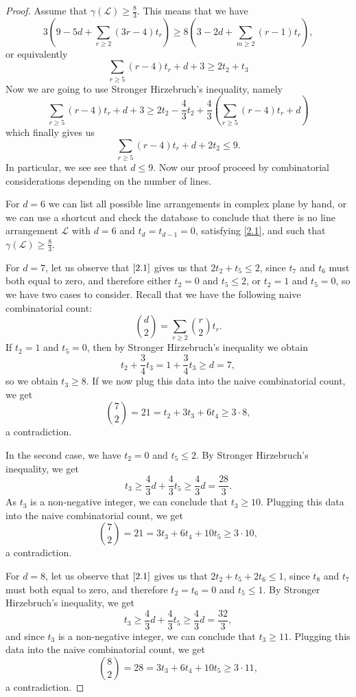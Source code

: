 \documentclass{article}
\theoremstyle{plain}
\theoremstyle{definition}
\numberwithin{equation}{section}
\begin{document}
\begin{proof}
Assume that  $\gamma(\mathcal{L})\geq\frac{8}{3}$. 
This means that we have
\[3(9-5d+\sum_{r\geq 2}(3r-4)t_{r}) \geq 8(3-2d+\sum_{m\geq 2}(r-1)t_{r}),\]
or equivalently
\[\sum_{r\geq 5}(r-4)t_{r} + d + 3\geq 2t_{2}+t_{3}\]
Now we are going to use Stronger Hirzebruch's inequality, namely
\[\sum_{r\geq 5}(r-4)t_{r} + d + 3 \geq 2t_{2} - \frac{4}{3} t_{2} + \dfrac{4}{3}\left(\sum_{r\geq 5}(r-4) t_{r} +d  \right)\]
which finally gives us
\begin{equation}\label{2.1}
\sum_{r\geq 5}(r-4)t_{r} + d + 2t_{2} \leq 9.    
\end{equation}
In particular, we see see that $d\leq 9$. Now our proof proceed by combinatorial considerations depending on the number of lines. 

For $d=6$ we can list all possible line arrangements in complex plane by hand, or we can use a shortcut and check the database \cite{Mat} to conclude that there is no line arrangement $\mathcal{L}$ with $d=6$ and $t_{d}=t_{d-1}=0$, satisfying \eqref{2.1}, and such that $\gamma(\mathcal{L}) \geq \frac{8}{3}$.

For $d=7$, let us observe that $\eqref{2.1}$ gives us that $2t_{2} + t_{5} \leq 2$, since $t_{7}$ and $t_{6}$ must both equal to zero, and therefore either $t_{2}=0$ and $t_{5}\leq 2$, or $t_{2}=1$ and $t_{5}=0$, so we have two cases to consider. Recall that we have the following naive combinatorial count:
\begin{equation}
\binom{d}{2} = \sum_{r\geq 2}\binom{r}{2}t_{r}.
\end{equation}
If $t_{2} =1$ and $t_{5}=0$, then by Stronger Hirzebruch's inequality we obtain
\[t_{2} + \frac{3}{4} t_{3} = 1 + \frac{3}{4} t_{3} \geq d = 7,\]
so we obtain $t_{3} \geq 8$. If we now plug this data into the naive combinatorial count, we get
\[\binom{7}{2} = 21 = t_{2} + 3t_{3} + 6t_{4} \geq 3\cdot 8,\]
a contradiction.

\noindent In the second case, we have $t_{2} = 0$ and $t_{5}\leq 2$. By Stronger Hirzebruch's inequality, we get
\[t_{3} \geq \frac{4}{3}d + \frac{4}{3}t_{5} \geq \frac{4}{3}d = \frac{28}{3}.\]
As $t_{3}$ is a non-negative integer, we can conclude that $t_{3}\geq 10$.
Plugging this data into the naive combinatorial count, we get
\[\binom{7}{2} = 21 = 3t_{3} + 6t_{4} + 10 t_{5}\geq 3\cdot 10,\]
a contradiction.

For $d=8$, let us observe that $\eqref{2.1}$ gives us that $2t_{2} + t_{5} + 2t_{6} \leq 1$, since $t_{8}$ and $t_{7}$ must both equal to zero, and therefore $t_{2}=t_{6}=0$ and $t_{5}\leq 1$.  By Stronger Hirzebruch's inequality, we get
\[t_{3} \geq \frac{4}{3}d + \frac{4}{3}t_{5} \geq \frac{4}{3}d=\frac{32}{3},\]
and since $t_{3}$ is a non-negative integer, we can conclude that $t_{3}\geq 11$.
Plugging this data into the naive combinatorial count, we get
\[\binom{8}{2} = 28 = 3t_{3} + 6t_{4} + 10 t_{5} \geq 3\cdot 11,\]
a contradiction.


\end{proof}
\end{document}
